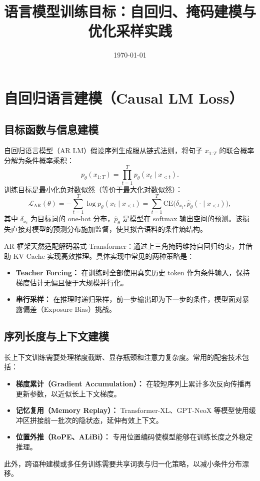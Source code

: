 \documentclass[UTF8,zihao=-4]{ctexart}
\title{语言模型训练目标：自回归、掩码建模与优化采样实践}
\author{}
\date{\today}
\begin{document}
\maketitle

\section{自回归语言建模（Causal LM Loss）}
\subsection{目标函数与信息建模}
自回归语言模型（AR LM）假设序列生成服从链式法则，将句子 $x_{1:T}$ 的联合概率分解为条件概率乘积：
\begin{equation}
  p_\theta(x_{1:T}) = \prod_{t=1}^{T} p_\theta(x_t \mid x_{<t}).
\end{equation}
训练目标是最小化负对数似然（等价于最大化对数似然）：
\begin{equation}
  \mathcal{L}_{\text{AR}}(\theta) = - \sum_{t=1}^{T} \log p_\theta(x_t \mid x_{<t}) = \sum_{t=1}^{T} \mathrm{CE}\big(\delta_{x_t}, \hat{p}_\theta(\cdot \mid x_{<t})\big),
\end{equation}
其中 $\delta_{x_t}$ 为目标词的 one-hot 分布，$\hat{p}_\theta$ 是模型在 softmax 输出空间的预测。该损失直接对模型的预测分布施加监督，使其拟合语料的条件熵结构。

AR 框架天然适配解码器式 Transformer：通过上三角掩码维持自回归约束，并借助 KV Cache 实现高效推理。具体实现中常见的两种策略是：
\begin{itemize}
  \item \textbf{Teacher Forcing：} 在训练时全部使用真实历史 token 作为条件输入，保持梯度估计无偏且便于大规模并行化。
  \item \textbf{串行采样：} 在推理时递归采样，前一步输出即为下一步的条件，模型面对暴露偏差（Exposure Bias）挑战。
\end{itemize}

\subsection{序列长度与上下文建模}
长上下文训练需要处理梯度截断、显存瓶颈和注意力复杂度。常用的配套技术包括：
\begin{itemize}
  \item \textbf{梯度累计（Gradient Accumulation）：} 在较短序列上累计多次反向传播再更新参数，以近似长上下文梯度。
  \item \textbf{记忆复用（Memory Replay）：} Transformer-XL、GPT-NeoX 等模型使用缓冲区拼接前一批次的隐状态，延伸有效上下文。
  \item \textbf{位置外推（RoPE、ALiBi）：} 专用位置编码使模型能够在训练长度之外稳定推理。
\end{itemize}
此外，跨语种建模或多任务训练需要共享词表与归一化策略，以减小条件分布漂移。
\end{document}
